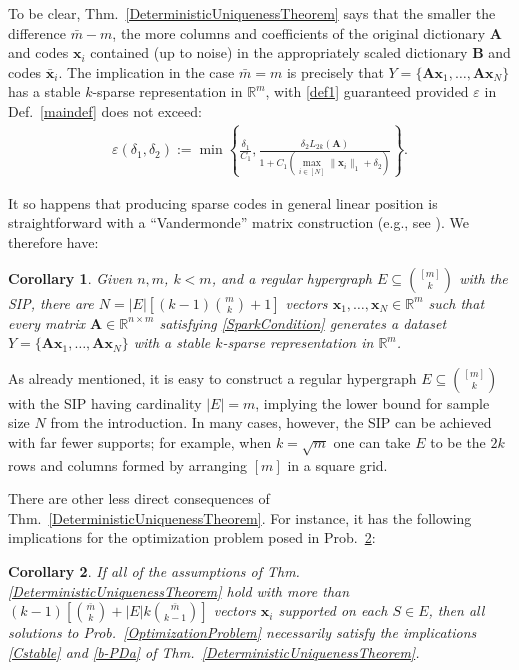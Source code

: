 \documentclass[9pt,twocolumn]{pnas-new}
\newtheorem{corollary}{Corollary}
\begin{document}
To be clear, Thm.~\ref{DeterministicUniquenessTheorem} says that the smaller the difference $\bar m - m$, the more columns and coefficients of the original dictionary $\mathbf{A}$ and codes $\mathbf{x}_i$ contained (up to noise) in the appropriately scaled dictionary $\mathbf{B}$ and codes $\mathbf{\bar x}_i$. 
The implication in the case $\bar{m} = m$ is precisely that $Y = \{\mathbf{Ax}_1, \ldots, \mathbf{Ax}_N\}$ has a stable $k$-sparse representation in $\mathbb{R}^m$, with \eqref{def1} guaranteed provided $\varepsilon$ in Def.~\ref{maindef} does not exceed: 
\begin{align}\label{epsdel}
\varepsilon(\delta_1, \delta_2) := \min \left\{ \frac{\delta_1}{ C_1 }, \frac{ \delta_2 L_{2k}(\mathbf{A})}{ 1 + C_1 \left( \max_{i \in [N]} \|\mathbf{x}_i\|_1  + \delta_2 \right) } \right\}.
\end{align}

It so happens that producing sparse codes in general linear position is straightforward with a ``Vandermonde'' matrix construction (e.g., see \cite{Hillar15}). We therefore have:

\begin{corollary}\label{DeterministicUniquenessCorollary}
Given $n, m$, $k < m$, and a regular hypergraph $E \subseteq {[m] \choose k}$ with the SIP, there are $N =  |E| \left[ (k-1){m \choose k} + 1  \right]$ vectors \mbox{$\mathbf{x}_1, \ldots, \mathbf{x}_N \in \mathbb{R}^m$} such that every matrix $\mathbf{A} \in \mathbb{R}^{n \times m}$ satisfying \eqref{SparkCondition} generates a dataset $Y = \{\mathbf{A}\mathbf{x}_1, \ldots, \mathbf{A}\mathbf{x}_N\}$ with a stable $k$-sparse representation in $\mathbb{R}^m$.
\end{corollary}

As already mentioned, it is easy to construct a regular hypergraph $E \subseteq {[m] \choose k}$ with the SIP having cardinality $|E| = m$, implying the lower bound for sample size $N$ from the introduction. In many cases, however, the SIP can be achieved with far fewer supports; for example, when $k = \sqrt{m}$ one can take $E$ to be the $2k$ rows and columns formed by arranging $[m]$ in a square grid.  

There are other less direct consequences of Thm.~\ref{DeterministicUniquenessTheorem}. For instance, it has the following implications for the optimization problem posed in Prob.~\ref{SLCopt}:

\begin{corollary}\label{SLCopt}
If all of the assumptions of Thm.\ref{DeterministicUniquenessTheorem} hold with more than $(k-1)\left[ {\bar m \choose k} + |E|k{\bar m \choose k-1}\right]$ vectors $\mathbf{x}_i$ supported on each $S \in E$, then all solutions to Prob.~\ref{OptimizationProblem} necessarily satisfy the implications \eqref{Cstable} and \eqref{b-PDa} of Thm.~\ref{DeterministicUniquenessTheorem}.
\end{corollary}
\end{document}
